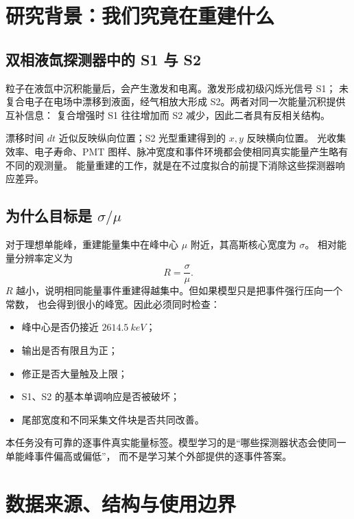 \documentclass[UTF8,11pt,a4paper,oneside,fontset=none]{ctexart}
\begin{document}
\clearpage
\tableofcontents
\clearpage
{}

\section{研究背景：我们究竟在重建什么}

\subsection{双相液氙探测器中的 S1 与 S2}

粒子在液氙中沉积能量后，会产生激发和电离。激发形成初级闪烁光信号 S1；
未复合电子在电场中漂移到液面，经气相放大形成 S2。两者对同一次能量沉积提供互补信息：
复合增强时 S1 往往增加而 S2 减少，因此二者具有反相关结构。

漂移时间 \(dt\) 近似反映纵向位置；S2 光型重建得到的 \(x,y\) 反映横向位置。
光收集效率、电子寿命、PMT 图样、脉冲宽度和事件环境都会使相同真实能量产生略有不同的观测量。
能量重建的工作，就是在不过度拟合的前提下消除这些探测器响应差异。

\subsection{为什么目标是 \texorpdfstring{\(\sigma/\mu\)}{sigma/mu}}

对于理想单能峰，重建能量集中在峰中心 \(\mu\) 附近，其高斯核心宽度为 \(\sigma\)。
相对能量分辨率定义为
\begin{equation}
R=\frac{\sigma}{\mu}.
\end{equation}
\(R\) 越小，说明相同能量事件重建得越集中。但如果模型只是把事件强行压向一个常数，
也会得到很小的峰宽。因此必须同时检查：
\begin{itemize}
  \item 峰中心是否仍接近 \(\SI{2614.5}{keV}\)；
  \item 输出是否有限且为正；
  \item 修正是否大量触及上限；
  \item S1、S2 的基本单调响应是否被破坏；
  \item 尾部宽度和不同采集文件块是否共同改善。
\end{itemize}

\begin{notebox}
本任务没有可靠的逐事件真实能量标签。模型学习的是“哪些探测器状态会使同一单能峰事件偏高或偏低”，
而不是学习某个外部提供的逐事件答案。
\end{notebox}

\section{数据来源、结构与使用边界}
\end{document}
